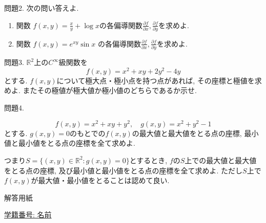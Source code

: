 \documentclass[dvipdfmx,a4paper,11pt]{article}
\newcommand{\R}{\mathbb{R}}
\theoremstyle{definition}
\newcommand{\pdrv}[2]{\frac{\partial #1}{\partial #2}}
\begin{document}
  \vspace{5pt}
  問題2. 次の問い答えよ. 

  \begin{enumerate}
 
     \item 関数 $f(x,y) = \frac{x}{y} + \log x$の各偏導関数$\pdrv{f}{x}, \pdrv{f}{y}$を求めよ.
        
    \item 関数 $f(x,y) = e^{xy}\sin x$ の各偏導関数$\pdrv{f}{x}, \pdrv{f}{y}$を求めよ.
    
  
  
    \end{enumerate}
    
       \vspace{11pt}
    問題3. 
  $\R^2$上の$C^\infty$級関数を
  $$f(x,y) = x^2 + xy+2y^2-4y$$
  とする.
$f(x,y) $について極大点・極小点を持つ点があれば, その座標と極値を求めよ. またその極値が極大値か極小値のどちらであるか示せ.  

   \vspace{11pt}
問題4.

 $$f(x,y) = x^2+xy+y^2,\quad  g(x,y) = x^2+y^2-1$$
 とする.
$g(x,y) =0$のもとでの$f(x,y)$の最大値と最大値をとる点の座標, 最小値と最小値をとる点の座標を全て求めよ. 

\vspace{4pt}
つまり$S = \{ (x,y) \in \R^2: g(x,y)=0\}$とするとき, $f$の$S$上での最大値と最大値をとる点の座標, 及び最小値と最小値をとる点の座標を全て求めよ.
ただし$S$上で$f(x,y)$が最大値・最小値をとることは認めて良い.
 \newpage

 \begin{center}
 {\Large 解答用紙}
\end{center}


\begin{flushleft}
{ \large \underline{学籍番号: \hspace{4cm} 名前  \hspace{9cm}   }  }
\end{flushleft}


 
\end{document}
